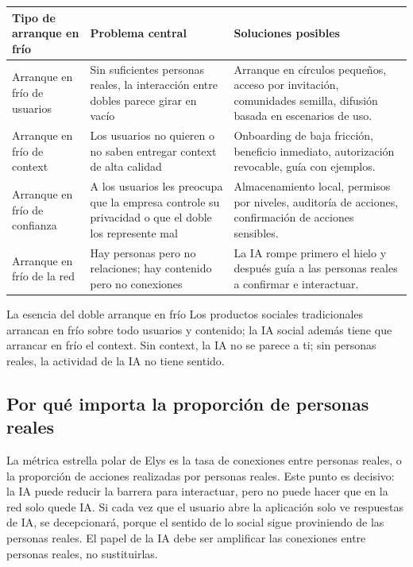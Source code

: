\documentclass[a4paper]{article}
\begin{document}
\noindent\begin{longtable}{p{}p{}p{}}
\toprule
Tipo de arranque en frío & Problema central & Soluciones posibles \\
\midrule
Arranque en frío de usuarios & Sin suficientes personas reales, la interacción entre dobles parece girar en vacío & Arranque en círculos pequeños, acceso por invitación, comunidades semilla, difusión basada en escenarios de uso. \\
Arranque en frío de context & Los usuarios no quieren o no saben entregar context de alta calidad & Onboarding de baja fricción, beneficio inmediato, autorización revocable, guía con ejemplos. \\
Arranque en frío de confianza & A los usuarios les preocupa que la empresa controle su privacidad o que el doble los represente mal & Almacenamiento local, permisos por niveles, auditoría de acciones, confirmación de acciones sensibles. \\
Arranque en frío de la red & Hay personas pero no relaciones; hay contenido pero no conexiones & La IA rompe primero el hielo y después guía a las personas reales a confirmar e interactuar. \\
\bottomrule
\end{longtable}

\begin{importantbox}{La esencia del doble arranque en frío}
Los productos sociales tradicionales arrancan en frío sobre todo usuarios y contenido; la IA social además tiene que arrancar en frío el context. Sin context, la IA no se parece a ti; sin personas reales, la actividad de la IA no tiene sentido.
\end{importantbox}

\subsection{Por qué importa la proporción de personas reales}

La métrica estrella polar de Elys es la tasa de conexiones entre personas reales, o la proporción de acciones realizadas por personas reales. Este punto es decisivo: la IA puede reducir la barrera para interactuar, pero no puede hacer que en la red solo quede IA. Si cada vez que el usuario abre la aplicación solo ve respuestas de IA, se decepcionará, porque el sentido de lo social sigue proviniendo de las personas reales. El papel de la IA debe ser amplificar las conexiones entre personas reales, no sustituirlas.
\end{document}
